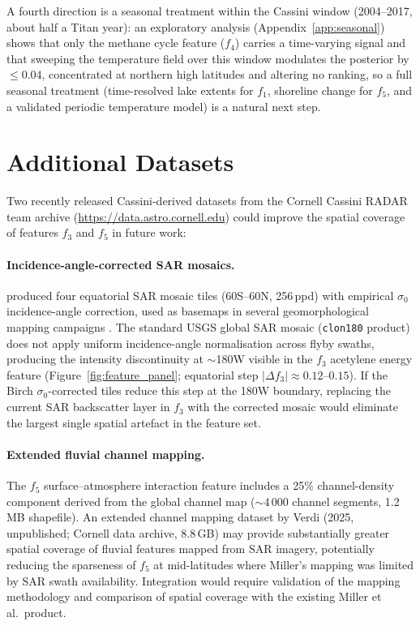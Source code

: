 A fourth direction is a seasonal treatment within the Cassini window (2004--2017, about half a Titan year): an exploratory analysis (Appendix~\ref{app:seasonal}) shows that only the methane cycle feature ($f_4$) carries a time-varying signal and that sweeping the \citet{Jennings2019} temperature field over this window modulates the posterior by $\leq 0.04$, concentrated at northern high latitudes and altering no ranking, so a full seasonal treatment (time-resolved lake extents for $f_1$, shoreline change for $f_5$, and a validated periodic temperature model) is a natural next step.

\section{Additional Datasets}
\label{sec:additional_datasets}

Two recently released Cassini-derived datasets from the Cornell Cassini RADAR team archive (\url{https://data.astro.cornell.edu}) could improve the spatial coverage of features $f_3$ and $f_5$ in future work:

\paragraph{Incidence-angle-corrected SAR mosaics.}
\citet{BirchHayesSAR} produced four equatorial SAR mosaic tiles (60\textdegree{}S--60\textdegree{}N, 256\,ppd) with empirical $\sigma_0$ incidence-angle correction, used as basemaps in several geomorphological mapping campaigns \citep{Malaska2025}.  The standard USGS global SAR mosaic (\texttt{clon180} product) does not apply uniform incidence-angle normalisation across flyby swaths, producing the intensity discontinuity at $\sim$180\textdegree{}W visible in the $f_3$ acetylene energy feature (Figure~\ref{fig:feature_panel}; equatorial step $|\Delta f_3| \approx 0.12$--$0.15$).  If the Birch $\sigma_0$-corrected tiles reduce this step at the 180\textdegree{}W boundary, replacing the current SAR backscatter layer in $f_3$ with the corrected mosaic would eliminate the largest single spatial artefact in the feature set.

\paragraph{Extended fluvial channel mapping.}
The $f_5$ surface--atmosphere interaction feature includes a 25\% channel-density component derived from the \citet{Miller2021channels} global channel map ($\sim$4\,000 channel segments, 1.2\,MB shapefile).  An extended channel mapping dataset by Verdi (2025, unpublished; Cornell data archive, 8.8\,GB) may provide substantially greater spatial coverage of fluvial features mapped from SAR imagery, potentially reducing the sparseness of $f_5$ at mid-latitudes where Miller's mapping was limited by SAR swath availability.  Integration would require validation of the mapping methodology and comparison of spatial coverage with the existing Miller et al.\ product.

